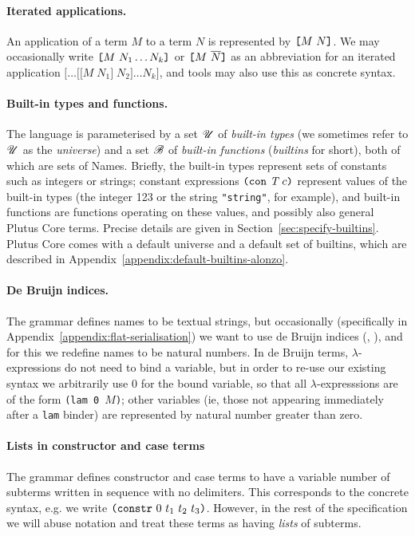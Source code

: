 \paragraph{Iterated applications.}
An application of a term $M$ to a term $N$ is represented by
$\texttt{[} M ~ N \texttt{]}$. We may occasionally write
$\texttt{[} M ~ N_1 \ldots N_k \texttt{]}$ or
$\texttt{[} M ~ \overline{N} \texttt{]}$ as an abbreviation for an iterated application
$\mathtt{[}\ldots\mathtt{[[}M\;N_1\mathtt{]}\;N_2\mathtt{]}\ldots N_k\mathtt{]}$,
and tools may also use this as concrete syntax.

\paragraph{Built-in types and functions.} The language is parameterised by a set $\mathscr{U}$ of
\textit{built-in types} (we sometimes refer to $\mathscr{U}$ as the
\textit{universe}) and a set $\mathscr{B}$ of \textit{built-in functions}
(\textit{builtins} for short), both of which are sets of Names.
Briefly, the built-in types represent sets of constants such as
integers or strings; constant expressions $\texttt{(} \texttt{con} ~ \textit{T} ~ c \texttt{)}$ represent
values of the built-in types (the integer 123 or the string
\texttt{"string"}, for example), and built-in functions are functions
operating on these values, and possibly also general Plutus Core
terms.  Precise details are given in
Section~\ref{sec:specify-builtins}.  Plutus Core comes with a default
universe and a default set of builtins, which are described in
Appendix~\ref{appendix:default-builtins-alonzo}.%

\paragraph{De Bruijn indices.}
The grammar defines names to be textual strings, but occasionally (specifically
in Appendix~\ref{appendix:flat-serialisation}) we want to use de Bruijn indices
(\cite{deBruijn}, \cite[C.3]{Barendregt}), and for this we redefine names to be
natural numbers.  In de Bruijn terms, $\lambda$-expressions do not need to bind
a variable, but in order to re-use our existing syntax we arbitrarily use 0 for
the bound variable, so that all $\lambda$-expresssions are of the form
\texttt{(lam 0 $M$)}; other variables (ie, those not appearing immediately after
a \texttt{lam} binder) are represented by natural number greater than zero.

\paragraph{Lists in constructor and case terms}
The grammar defines constructor and case terms to have a variable number of
subterms written in sequence with no delimiters. This corresponds to the
concrete syntax, e.g. we write $\texttt{(} \texttt{constr} ~ 0 ~ t_1\ t_2\ t_3 \texttt{)}$. However, in the
rest of the specification we will abuse notation and treat these terms as
having \emph{lists} of subterms.

